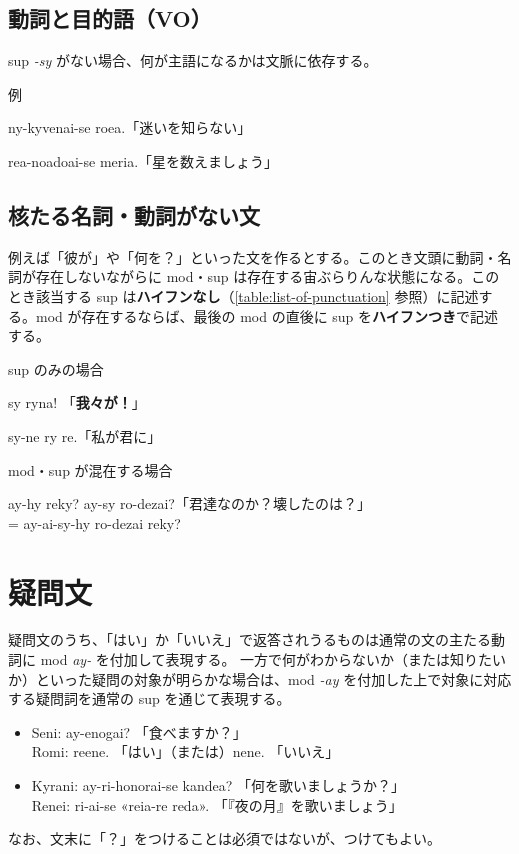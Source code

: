 \subsection{動詞と目的語（VO）}
sup \emph{-sy} がない場合、何が主語になるかは文脈に依存する。

\begin{itembox}[l]{例}
    \begin{pindent}
        \noindent
        ny-kyvenai-se roea.「迷いを知らない」

        \noindent
        rea-noadoai-se meria.「星を数えましょう」
    \end{pindent}
\end{itembox}

\subsection{核たる名詞・動詞がない文}
\label{section:sentence-without-noun-verb}

例えば「彼が」や「何を？」といった文を作るとする。このとき文頭に動詞・名詞が存在しないながらに mod・sup は存在する宙ぶらりんな状態になる。このとき該当する sup は\textbf{ハイフンなし}（\cref{table:list-of-punctuation} 参照）に記述する。mod が存在するならば、最後の mod の直後に sup を\textbf{ハイフンつき}で記述する。

\begin{itembox}[l]{sup のみの場合}
    \begin{pindent}
        \noindent
        sy ryna! 「\textbf{我々が！}」

        \noindent
        sy-ne ry re.「私が君に」
    \end{pindent}
\end{itembox}

\begin{itembox}[l]{mod・sup が混在する場合}
    \begin{pindent}
        \noindent
        ay-hy reky? ay-sy ro-dezai?「君達なのか？壊したのは？」\\
        = ay-ai-sy-hy ro-dezai reky?
    \end{pindent}
\end{itembox}

\section{疑問文}

疑問文のうち、「はい」か「いいえ」で返答されうるものは通常の文の主たる動詞に mod \emph{ay-} を付加して表現する。
一方で何がわからないか（または知りたいか）といった疑問の対象が明らかな場合は、mod \emph{-ay} を付加した上で対象に対応する疑問詞を通常の sup を通じて表現する。

\begin{itemize}
    \item Seni: ay-enogai? 「食べますか？」 \\ Romi: reene. 「はい」（または）nene. 「いいえ」
    \item Kyrani: ay-ri-honorai-se kandea? 「何を歌いましょうか？」\\ Renei: ri-ai-se «reia-re reda». 「『夜の月』を歌いましょう」
\end{itemize}

なお、文末に「？」をつけることは必須ではないが、つけてもよい。